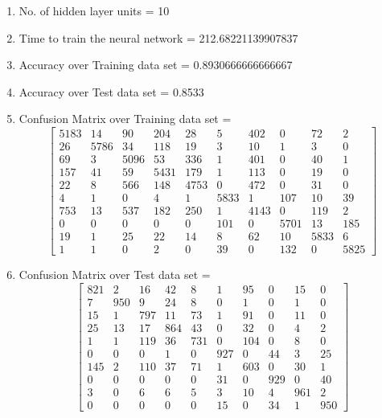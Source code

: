 \documentclass[11pt]{article}
\begin{document}
\hline
\begin{enumerate}
\item No. of hidden layer units = 10
\item Time to train the neural network = 212.68221139907837
\item Accuracy over Training data set = 0.8930666666666667
\item Accuracy over Test data set = 0.8533
\item Confusion Matrix over Training data set = 
\begin{equation}
  \begin{bmatrix}
5183 & 14 & 90 & 204 & 28 & 5 & 402 & 0 & 72 & 2\\
26 & 5786 & 34 & 118 & 19 & 3 & 10 & 1 & 3 & 0\\
69 & 3 & 5096 & 53 & 336 & 1 & 401 & 0 & 40 & 1\\
157 & 41 & 59 & 5431 & 179 & 1 & 113 & 0 & 19 & 0\\
22 & 8 & 566 & 148 & 4753 & 0 & 472 & 0 & 31 & 0\\
4 & 1 & 0 & 4 & 1 & 5833 & 1 & 107 & 10 & 39\\
753 & 13 & 537 & 182 & 250 & 1 & 4143 & 0 & 119 & 2\\
0 & 0 & 0 & 0 & 0 & 101 & 0 & 5701 & 13 & 185\\
19 & 1 & 25 & 22 & 14 & 8 & 62 & 10 & 5833 & 6\\
1 & 1 & 0 & 2 & 0 & 39 & 0 & 132 & 0 & 5825
  \end{bmatrix}
\end{equation}
\item Confusion Matrix over Test data set = 
\begin{equation}
  \begin{bmatrix}
821 & 2 & 16 & 42 & 8 & 1 & 95 & 0 & 15 & 0\\
7 & 950 & 9 & 24 & 8 & 0 & 1 & 0 & 1 & 0\\
15 & 1 & 797 & 11 & 73 & 1 & 91 & 0 & 11 & 0\\
25 & 13 & 17 & 864 & 43 & 0 & 32 & 0 & 4 & 2\\
1 & 1 & 119 & 36 & 731 & 0 & 104 & 0 & 8 & 0\\
0 & 0 & 0 & 1 & 0 & 927 & 0 & 44 & 3 & 25\\
145 & 2 & 110 & 37 & 71 & 1 & 603 & 0 & 30 & 1\\
0 & 0 & 0 & 0 & 0 & 31 & 0 & 929 & 0 & 40\\
3 & 0 & 6 & 6 & 5 & 3 & 10 & 4 & 961 & 2\\
0 & 0 & 0 & 0 & 0 & 15 & 0 & 34 & 1 & 950
  \end{bmatrix}
\end{equation}
\end{enumerate}
\end{document}
